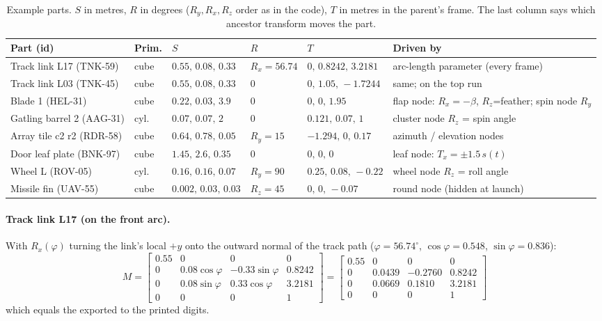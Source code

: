 \begin{table}[h]
\centering\footnotesize
\setlength{\tabcolsep}{3pt}
\caption{Example parts. $S$ in metres, $R$ in degrees ($R_y,R_x,R_z$ order as in the code), $T$ in metres in the
parent's frame. The last column says which ancestor transform moves the part.}
\label{tab:mexamples}
\begin{tabular}{@{}p{2.5cm}l p{2.5cm} p{1.7cm} p{3.2cm} p{3.2cm}@{}}
\toprule
Part (id) & Prim. & $S$ & $R$ & $T$ & Driven by\\\midrule
Track link L17 (TNK-59) & cube & $0.55,\,0.08,\,0.33$ & $R_x=56.74$ & $0,\,0.8242,\,3.2181$ & arc-length parameter (every frame)\\
Track link L03 (TNK-45) & cube & $0.55,\,0.08,\,0.33$ & $0$ & $0,\,1.05,\,-1.7244$ & same; on the top run\\
Blade 1 (HEL-31) & cube & $0.22,\,0.03,\,3.9$ & $0$ & $0,\,0,\,1.95$ & flap node: $R_x=-\beta$, $R_z$=feather; spin node $R_y$\\
Gatling barrel 2 (AAG-31) & cyl. & $0.07,\,0.07,\,2$ & $0$ & $0.121,\,0.07,\,1$ & cluster node $R_z$ = spin angle\\
Array tile c2 r2 (RDR-58) & cube & $0.64,\,0.78,\,0.05$ & $R_y=15$ & $-1.294,\,0,\,0.17$ & azimuth / elevation nodes\\
Door leaf plate (BNK-97) & cube & $1.45,\,2.6,\,0.35$ & $0$ & $0,\,0,\,0$ & leaf node: $T_x=\pm1.5\,s(t)$\\
Wheel L (ROV-05) & cyl. & $0.16,\,0.16,\,0.07$ & $R_y=90$ & $0.25,\,0.08,\,-0.22$ & wheel node $R_z$ = roll angle\\
Missile fin (UAV-55) & cube & $0.002,\,0.03,\,0.03$ & $R_z=45$ & $0,\,0,\,-0.07$ & round node (hidden at launch)\\\bottomrule
\end{tabular}
\end{table}

\paragraph{Track link L17 (on the front arc).} With $R_x(\varphi)$ turning the link's local $+y$ onto the outward
normal of the track path ($\varphi=56.74^\circ$, $\cos\varphi=0.548$, $\sin\varphi=0.836$):
\begin{equation}
M=\begin{bmatrix}0.55&0&0&0\\0&0.08\cos\varphi&-0.33\sin\varphi&0.8242\\0&0.08\sin\varphi&0.33\cos\varphi&3.2181\\0&0&0&1\end{bmatrix}
=\begin{bmatrix}0.55&0&0&0\\0&0.0439&-0.2760&0.8242\\0&0.0669&0.1810&3.2181\\0&0&0&1\end{bmatrix}
\end{equation}
which equals the exported  to the printed digits.

